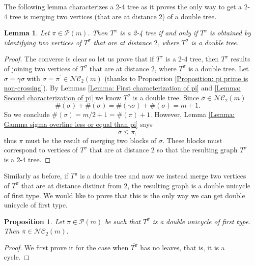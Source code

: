 \documentclass{article}
\newtheorem{lemma}      [theorem]{Lemma}
\newtheorem{proposition}[theorem]{Proposition}
\theoremstyle{definition}
\newcommand{\cP}{\mathcal{P}}
\newcommand{\NC}{\mathcal{NC}}
\begin{document}
{The following lemma characterizes a 2-4 tree as it proves the only way to get a 2-4 tree is merging two vertices (that are at distance 2) of a double tree.

\begin{lemma}\label{Lemma: Characterization of 2-4 tree}
Let $\pi\in \cP(m)$. Then $T^\pi$ is a 2-4 tree if and only if $T^\pi$ is obtained by identifying two vertices of $T^\sigma$ that are at distance $2$, where $T^\sigma$ is a double tree.
\end{lemma}
\begin{proof}
The converse is clear so let us prove that if $T^\pi$ is a 2-4 tree, then $T^\pi$ results of joining two vertices of $T^\sigma$ that are at distance $2$, where $T^\sigma$ is a double tree. Let $\sigma=\gamma\overline{\sigma}$ with $\overline{\sigma}=\overline{\pi}^\prime\in \NC_2(m)$ (thanks to Proposition \ref{Proposition: pi prime is non-crossing}). By Lemmas \ref{Lemma: First characterization of pi} and \ref{Lemma: Second characterization of pi} we know $T^\sigma$ is a double tree. Since $\overline{\sigma}\in \NC_2(m)$
$$\#(\sigma)+\#(\overline{\sigma})=\#(\gamma\overline{\sigma})+\#(\overline{\sigma})=m+1.$$
So we conclude $\#(\sigma)=m/2+1=\#(\pi)+1$. However, Lemma \ref{Lemma: Gamma sigma overline less or equal than pi} says
$$\sigma \leq \pi,$$
thus $\pi$ must be the result of merging two blocks of $\sigma$. These blocks must correspond to vertices of $T^\sigma$ that are at distance 2 so that the resulting graph $T^\pi$ is a 2-4 tree.
\end{proof}

Similarly as before, if $T^\pi$ is a double tree and now we instead merge two vertices of $T^\pi$ that are at distance distinct from $2$, the resulting graph is a double unicycle of first type. We would like to prove that this is the only way we can get double unicycle of first type.

\begin{proposition}\label{Proposition: pi is non-crossing}
Let $\pi\in \cP(m)$ be such that $T^\pi$ is a double unicycle of first type. Then $\overline{\pi}\in \NC_2(m)$.
\end{proposition}
\begin{proof}
We first prove it for the case when $\overline{T^\pi}$ has no leaves, that is, it is a cycle. 


\end{proof}}
\end{document}
